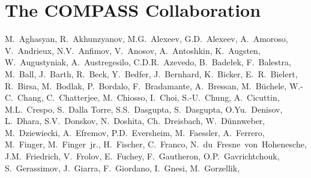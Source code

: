 %
%
\section*{The COMPASS Collaboration}
\label{app:collab}
\renewcommand\labelenumi{\textsuperscript{\theenumi}~}
\renewcommand\theenumi{\arabic{enumi}}
\begin{flushleft}
M.~Aghasyan,
R.~Akhunzyanov, %
M.G.~Alexeev,
G.D.~Alexeev, %
A.~Amoroso,
V.~Andrieux,
N.V.~Anfimov, %
V.~Anosov, %
A.~Antoshkin, %
K.~Augsten, %
W.~Augustyniak,
A.~Austregesilo,
C.D.R.~Azevedo,
B.~Bade{\l}ek,
F.~Balestra,
M.~Ball,
J.~Barth,
R.~Beck,
Y.~Bedfer,
J.~Bernhard,
K.~Bicker,
E.~R.~Bielert,
R.~Birsa,
M.~Bodlak,
P.~Bordalo,
F.~Bradamante,
A.~Bressan,
M.~B\"uchele,
W.-C.~Chang,
C.~Chatterjee,
M.~Chiosso,
I.~Choi,
S.-U.~Chung,
A.~Cicuttin,
M.L.~Crespo,
S.~Dalla Torre,
S.S.~Dasgupta,
S.~Dasgupta,
O.Yu.~Denisov\CorAuth,
L.~Dhara,
S.V.~Donskov,
N.~Doshita,
Ch.~Dreisbach,
W.~D\"unnweber,
M.~Dziewiecki,
A.~Efremov, %
P.D.~Eversheim,
M.~Faessler,
A.~Ferrero,
M.~Finger,
M.~Finger~jr.,
H.~Fischer,
C.~Franco,
N.~du~Fresne~von~Hohenesche,
J.M.~Friedrich,
V.~Frolov,   %
E.~Fuchey,
F.~Gautheron,
O.P.~Gavrichtchouk, %
S.~Gerassimov,
J.~Giarra,
F.~Giordano,
I.~Gnesi,
M.~Gorzellik,

\end{flushleft}
